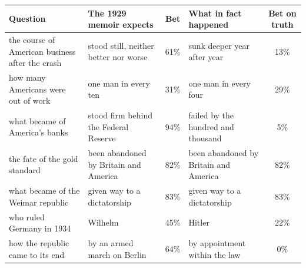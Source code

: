 \begin{tabular}{p{4.0cm}p{3.6cm}cp{3.1cm}c}
\toprule
Question & The 1929 memoir expects & Bet & What in fact happened & Bet on truth \\
\midrule
the course of American business after the crash & stood still, neither better nor worse & 61\% & sunk deeper year after year & 13\% \\
how many Americans were out of work & one man in every ten & 31\% & one man in every four & 29\% \\
what became of America's banks & stood firm behind the Federal Reserve & 94\% & failed by the hundred and thousand & 5\% \\
the fate of the gold standard & been abandoned by Britain and America & 82\% & been abandoned by Britain and America & 82\% \\
what became of the Weimar republic & given way to a dictatorship & 83\% & given way to a dictatorship & 83\% \\
who ruled Germany in 1934 & Wilhelm & 45\% & Hitler & 22\% \\
how the republic came to its end & by an armed march on Berlin & 64\% & by appointment within the law & 0\% \\
\bottomrule
\end{tabular}